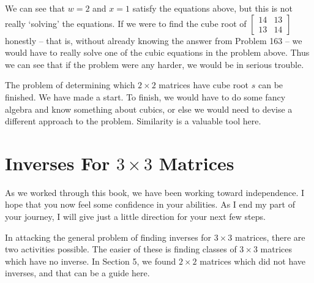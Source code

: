 \documentclass{article}
\begin{document}
We can see that $w=2$ and $x=1$ satisfy the equations above, but this is not really `solving' the equations. If we were to find the cube root of $\begin{bmatrix} 14 & 13 \\ 13 & 14 \end{bmatrix}$ honestly -- that is, without already knowing the answer from Problem 163 -- we would have to really solve one of the cubic equations in the problem above. Thus we can see that if the problem were any harder, we would be in serious trouble.

The problem of determining which $2 \times 2$ matrices have cube root $s$ can be finished. We have made a start. To finish, we would have to do some fancy algebra and know something about cubics, or else we would need to devise a different approach to the problem. Similarity is a valuable tool here.




\newpage

\section{Inverses For $3 \times 3$ Matrices}

As we worked through this book, we have been working toward independence. I hope that you now feel some confidence in your abilities. As I end my part of your journey, I will give just a little direction for your next few steps.

In attacking the general problem of finding inverses for $3 \times 3$ matrices, there are two activities possible. The easier of these is finding classes of $3 \times 3$ matrices which have no inverse. In Section 5, we found $2 \times 2$ matrices which did not have inverses, and that can be a guide here.
\end{document}
